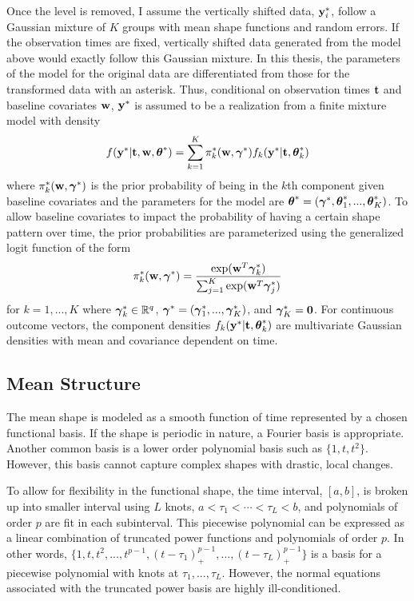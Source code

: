 Once the level is removed, I assume the vertically shifted data, $\mathbf y_{i}^{*}$, follow a Gaussian mixture of $K$ groups with mean shape functions and random errors. If the observation times are fixed, vertically shifted data generated from the model above would exactly follow this Gaussian mixture. In this thesis, the parameters of the model for the original data are differentiated from those for the transformed data with an asterisk. Thus, conditional on observation times $\mathbf t$ and baseline covariates $\mathbf w$, $\mathbf y^{*}$ is assumed to be a realization from a finite mixture model with density
\begin{align*}
 f(\mathbf y^{*}|\mathbf t,\mathbf w,\boldsymbol\theta^{*}) =  \sum^{K}_{k=1}\pi^{*}_{k}(\mathbf w,\boldsymbol \gamma^{*})f_{k}( \mathbf y^{*}|\mathbf t,\boldsymbol\theta^{*}_{k})
\end{align*}
where $\pi^{*}_{k}(\mathbf w,\boldsymbol \gamma^{*})$ is the prior probability of being in the $k$th component given baseline covariates and the parameters for the model are $\boldsymbol\theta^{*} = (\boldsymbol\gamma^{*},\boldsymbol\theta^{*}_{1},...,\boldsymbol\theta^{*}_{K})$. To allow baseline covariates to impact the probability of having a certain shape pattern over time, the prior probabilities are parameterized using the generalized logit function of the form
$$\pi^{*}_{k}(\mathbf w,\boldsymbol\gamma^{*})=\frac{\exp(\mathbf w^{T}\boldsymbol\gamma^{*}_{k})}{\sum_{j=1}^{K}\exp(\mathbf w^{T}\boldsymbol\gamma^{*}_{j})}$$ 
for $k=1,...,K$ where $\boldsymbol \gamma^{*}_{k}\in\mathbb{R}^{q}$, $\boldsymbol\gamma^{*} = (\boldsymbol\gamma^{*}_{1},...,\boldsymbol\gamma^{*}_{K})$, and $\boldsymbol\gamma^{*}_{K}=\mathbf 0$. For continuous outcome vectors, the component densities $f_{k}(\mathbf y^{*}|\mathbf t,\boldsymbol\theta^{*}_{k})$ are multivariate Gaussian densities with mean and covariance dependent  on time.

\subsection{Mean Structure}
The mean shape is modeled as a smooth function of time represented by a chosen functional basis. If the shape is periodic in nature, a Fourier basis is appropriate. Another common basis is a lower order polynomial basis such as $\{1, t, t^{2}\}$. However, this basis cannot capture complex shapes with drastic, local changes. 

To allow for flexibility in the functional shape, the time interval, $[a,b]$, is broken up into smaller interval using $L$ knots, $a<\tau_{1}<\cdots<\tau_{L}<b$, and polynomials of order $p$ are fit in each subinterval. This piecewise polynomial can be expressed as a linear combination of truncated power functions and polynomials of order $p$. In other words,
$\{1,t,t^{2},...,t^{p-1},(t-\tau_{1})_{+}^{p-1},...,(t-\tau_{L})_{+}^{p-1}\}$
is a basis for a piecewise polynomial with knots at $\tau_{1},...,\tau_{L}$. However, the normal equations associated with the truncated power basis are highly ill-conditioned. 

